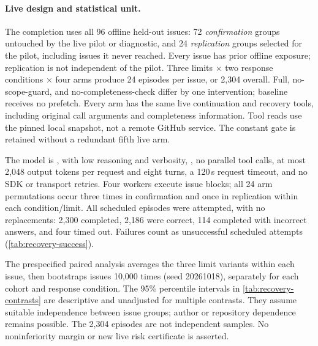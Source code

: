 \paragraph{Live design and statistical unit.}
The completion uses all 96 offline held-out issues: 72 \emph{confirmation}
groups untouched by the live pilot or diagnostic, and 24 \emph{replication}
groups selected for the pilot, including issues it never reached. Every issue
has prior offline exposure; replication is not independent of the pilot.
Three limits $\times$ two response conditions $\times$ four arms produce 24
episodes per issue, or 2{,}304 overall. Full, no-scope-guard, and
no-completeness-check differ by one intervention; baseline receives no prefetch.
Every arm has the same live continuation and recovery tools, including original
call arguments and completeness information. Tool reads use the pinned local
snapshot, not a remote GitHub service. The constant gate is retained without a
redundant fifth live arm.

The model is , with low reasoning and verbosity,
, no parallel tool calls, at most 2{,}048 output tokens per
request and eight turns, a 120\,s request timeout, and no SDK or transport
retries. Four workers execute issue blocks; all 24 arm permutations occur three
times in confirmation and once in replication within each condition/limit.
All scheduled episodes were attempted, with no replacements: 2{,}300 completed,
2{,}186 were correct, 114 completed with incorrect answers, and four timed out.
Failures count as unsuccessful scheduled attempts (\cref{tab:recovery-success}).

The prespecified paired analysis averages the three limit variants within each
issue, then bootstraps issues 10{,}000 times (seed 20261018), separately for each
cohort and response condition. The 95\% percentile intervals in
\cref{tab:recovery-contrasts} are descriptive and unadjusted for multiple
contrasts. They assume suitable independence between issue groups; author or
repository dependence remains possible. The 2{,}304 episodes are not independent
samples. No noninferiority margin or new live risk certificate is asserted.

